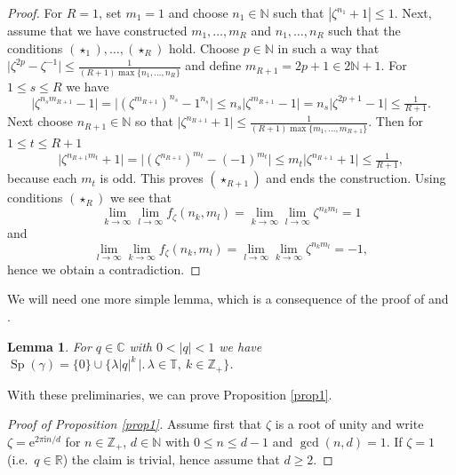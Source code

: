\documentclass[12pt,reqno,a4paper]{amsart}
\newtheorem{lemma}[proposition]{Lemma}
\theoremstyle{definition}
\newcommand{\ee}{\mathrm{e}}
\newcommand{\ii}{\mathrm{i}}
\newcommand{\CC}{\mathbb{C}}
\newcommand{\NN}{\mathbb{N}}
\newcommand{\RR}{\mathbb{R}}
\newcommand{\TT}{\mathbb{T}}
\newcommand{\ZZ}{\mathbb{Z}}
\numberwithin{equation}{section}
\begin{document}
\begin{appendices}
\begin{proof}
For $R=1$, set $m_1=1$ and choose $n_1\in\NN$ such that $|\zeta^{n_1}+1|\le 1$. Next, assume that we have constructed $m_1,\dotsc,m_R$ and $n_1,\dotsc,n_R$ such that the conditions $(\star_1),\dotsc,(\star_R)$ hold. Choose $p\in\NN$ in such a way that $\bigl|\zeta^{2p}-\zeta^{-1}\bigr|\leq\tfrac{1}{(R+1)\max\{n_1,\dotsc,n_R\}}$ and define $m_{R+1}=2p+1\in 2\NN+1$. For $1\le s \le R$ we have
\[
\bigl|\zeta^{n_sm_{R+1}}-1\bigr|
=\bigl|(\zeta^{m_{R+1}})^{n_s}-1^{n_s}\bigr|
\leq n_s\bigl|\zeta^{m_{R+1}}-1\bigr|
=n_s\bigl|\zeta^{2p+1}-1\bigr|
\leq\tfrac{1}{R+1}.
\]
Next choose $n_{R+1}\in\NN$ so that $\bigl|\zeta^{n_{R+1}}+1\bigr|\leq\tfrac{1}{(R+1) \max\{m_1,\dotsc,m_{R+1}\}}$. Then for $1\leq t\leq R+1$
\[
\bigl|\zeta^{n_{R+1}m_t}+1\bigr|
=\bigl|(\zeta^{n_{R+1}})^{m_t}-(-1)^{m_t}\bigr|
\leq m_t\bigl|\zeta^{n_{R+1}}+1\bigr|\leq\tfrac{1}{R+1},
\]
because each $m_t$ is odd. This proves $(\star_{R+1})$ and ends the construction. Using conditions $(\star_R)$ we see that
\[
\lim_{k\to\infty}\lim_{l\to\infty}f_\zeta(n_k,m_l)
=\lim_{k\to\infty}\lim_{l\to\infty}\zeta^{n_km_l}=1
\]
and
\[
\lim_{l\to\infty}\lim_{k\to\infty}f_\zeta(n_k,m_l)
=\lim_{l\to\infty}\lim_{k\to\infty}\zeta^{n_km_l}=-1,
\]
hence we obtain a contradiction.
\end{proof}

We will need one more simple lemma, which is a consequence of the proof of \cite[Theorem 2.3]{BraidedSU2} and \cite[Equation (2.6)]{KrajczokSoltan}.

\begin{lemma}\label{lemma3}
For $q\in\CC$ with $0<|q|<1$ we have $\operatorname{Sp}(\gamma)=\{0\}\cup\bigl\{\lambda|q|^{k}\,\bigr|\bigl.\,\lambda\in\TT,\:k\in\ZZ_+\bigr\}$.
\end{lemma}

With these preliminaries, we can prove Proposition \ref{prop1}. 

\begin{proof}[Proof of Proposition \ref{prop1}]
Assume first that $\zeta$ is a root of unity and write $\zeta=\ee^{2\pi\ii n/d}$ for $n\in\ZZ_+$, $d\in\NN$ with $0\le n\le d-1$ and $\gcd(n,d)=1$. If $\zeta=1$ (i.e.~$q\in \RR$) the claim is trivial, hence assume that $d\ge 2$.
 

\end{proof}
\end{appendices}
\end{document}
